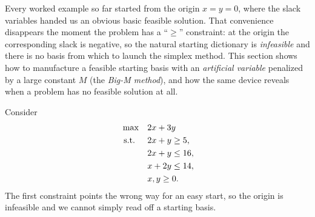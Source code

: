 Every worked example so far started from the origin $x=y=0$, where the slack variables handed us an obvious basic feasible solution. That convenience disappears the moment the problem has a ``$\ge$'' constraint: at the origin the corresponding slack is negative, so the natural starting dictionary is \emph{infeasible} and there is no basis from which to launch the simplex method. This section shows how to manufacture a feasible starting basis with an \emph{artificial variable} penalized by a large constant $M$ (the \emph{Big-M method}), and how the same device reveals when a problem has no feasible solution at all.

Consider
\[
\begin{aligned}
\max\quad & 2x + 3y \\
\mbox{ s.t. }\quad & 2x + y \geq 5, \\
& 2x + y \leq 16, \\
& x + 2y \leq 14, \\
& x, y \geq 0.
\end{aligned}
\]
The first constraint points the wrong way for an easy start, so the origin is infeasible and we cannot simply read off a starting basis.

